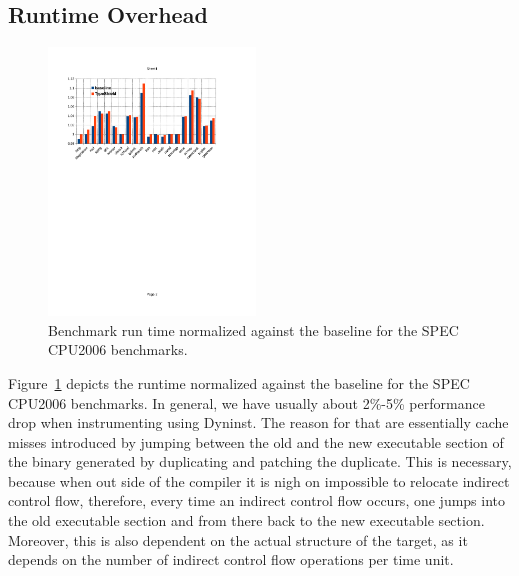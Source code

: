 \subsection{Runtime Overhead}
\label{section:typeshieldoverheadperformance}
\textit{}\newline
\begin{figure}[h!]
    \centering
    \includegraphics[width=0.49\textwidth]{figures/speccpu2006.pdf}
    \caption{Benchmark run time normalized against the baseline for the SPEC CPU2006 benchmarks.
    }
    \label{fig:awesome_image}
\end{figure}

Figure~\ref{fig:awesome_image} depicts the runtime normalized against the baseline for
the SPEC CPU2006 benchmarks. In general, we have usually about 2\%-5\% performance drop when instrumenting using Dyninst. 
The reason for that are essentially cache misses introduced by jumping between the old and the new executable section of the binary 
generated by duplicating and patching the duplicate. This is necessary, because when out side of the compiler it is nigh on impossible to 
relocate indirect control flow, therefore, every time an indirect control flow occurs, one jumps into the old executable section and 
from there back to the new executable section. 
Moreover, this is also dependent on the actual structure of the target, as it depends on the number of indirect control flow operations per time unit.


